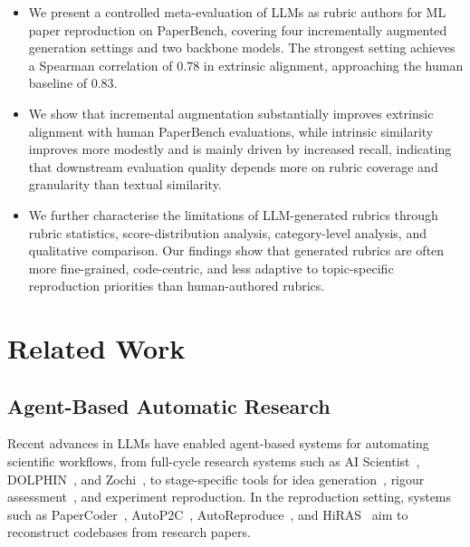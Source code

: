 \documentclass[11pt]{article}
\begin{document}
\begin{itemize}

\item We present a controlled meta-evaluation of LLMs as rubric authors for ML paper reproduction on PaperBench, covering four incrementally augmented generation settings and two backbone models. The strongest setting achieves a Spearman correlation of $0.78$ in extrinsic alignment, approaching the human baseline of $0.83$.

\item We show that incremental augmentation substantially improves extrinsic alignment with human PaperBench evaluations, while intrinsic similarity improves more modestly and is mainly driven by increased recall, indicating that downstream evaluation quality depends more on rubric coverage and granularity than textual similarity.

\item We further characterise the limitations of LLM-generated rubrics through rubric statistics, score-distribution analysis, category-level analysis, and qualitative comparison. Our findings show that generated rubrics are often more fine-grained, code-centric, and less adaptive to topic-specific reproduction priorities than human-authored rubrics.

\end{itemize}

\section{Related Work}

\subsection{Agent-Based Automatic Research}

Recent advances in LLMs have enabled agent-based systems for automating scientific workflows, from full-cycle research systems such as AI Scientist~\cite{DBLP:journals/corr/abs-2408-06292,yamada2025aiscientistv2workshoplevelautomated}, DOLPHIN~\cite{yuan-etal-2025-dolphin}, and Zochi~\cite{zochi2025}, to stage-specific tools for idea generation~\cite{wang-etal-2024-scimon,li-etal-2025-chain-ideas}, rigour assessment~\cite{james-etal-2024-rigour}, and experiment reproduction. In the reproduction setting, systems such as PaperCoder~\cite{seo2025paper2codeautomatingcodegeneration}, AutoP2C~\cite{lin2025autop2cllmbasedagentframework}, AutoReproduce~\cite{zhao2025autoreproduceautomaticaiexperiment}, and HiRAS~\cite{hong2026hirashierarchicalmultiagentframework} aim to reconstruct codebases from research papers.
\end{document}
